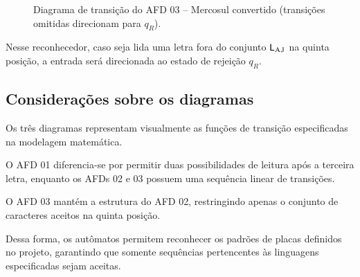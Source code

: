 \begin{figure}[ht]
\centering
{}
\caption{Diagrama de transição do AFD 03 -- Mercosul convertido (transições omitidas direcionam para $q_R$).}
\label{fig:afd-convertido}
\end{figure}

Nesse reconhecedor, caso seja lida uma letra fora do
conjunto $\mathsf{L}_{\mathrm{AJ}}$ na quinta posição, a entrada será
direcionada ao estado de rejeição $q_R$.

\subsection{Considerações sobre os diagramas}

Os três diagramas representam visualmente as funções
de transição especificadas na modelagem matemática.

O AFD 01 diferencia-se por permitir duas possibilidades
de leitura após a terceira letra, enquanto os AFDs 02
e 03 possuem uma sequência linear de transições.

O AFD 03 mantém a estrutura do AFD 02, restringindo
apenas o conjunto de caracteres aceitos na quinta posição.

Dessa forma, os autômatos permitem reconhecer os padrões
de placas definidos no projeto, garantindo que somente
sequências pertencentes às linguagens especificadas
sejam aceitas.